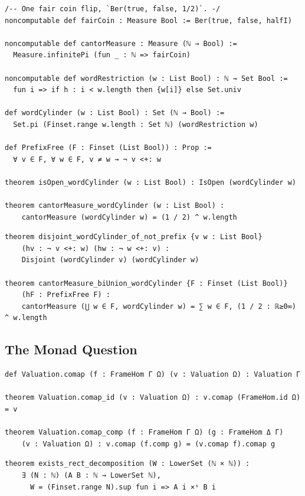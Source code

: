 \label{lean:isopen-wordcylinder}
\begin{lstlisting}
/-- One fair coin flip, `Ber(true, false, 1/2)`. -/
noncomputable def fairCoin : Measure Bool := Ber(true, false, halfI)

noncomputable def cantorMeasure : Measure (ℕ → Bool) :=
  Measure.infinitePi (fun _ : ℕ => fairCoin)

noncomputable def wordRestriction (w : List Bool) : ℕ → Set Bool :=
  fun i => if h : i < w.length then {w[i]} else Set.univ

def wordCylinder (w : List Bool) : Set (ℕ → Bool) :=
  Set.pi (Finset.range w.length : Set ℕ) (wordRestriction w)

def PrefixFree (F : Finset (List Bool)) : Prop :=
  ∀ v ∈ F, ∀ w ∈ F, v ≠ w → ¬ v <+: w

theorem isOpen_wordCylinder (w : List Bool) : IsOpen (wordCylinder w)

theorem cantorMeasure_wordCylinder (w : List Bool) :
    cantorMeasure (wordCylinder w) = (1 / 2) ^ w.length
\end{lstlisting}

\label{lean:cantormeasure-biunion-wordcylinder}
\begin{lstlisting}
theorem disjoint_wordCylinder_of_not_prefix {v w : List Bool}
    (hv : ¬ v <+: w) (hw : ¬ w <+: v) :
    Disjoint (wordCylinder v) (wordCylinder w)

theorem cantorMeasure_biUnion_wordCylinder {F : Finset (List Bool)}
    (hF : PrefixFree F) :
    cantorMeasure (⋃ w ∈ F, wordCylinder w) = ∑ w ∈ F, (1 / 2 : ℝ≥0∞) ^ w.length
\end{lstlisting}

\subsection{The Monad Question}

\label{lean:valuation-comap}
\begin{lstlisting}
def Valuation.comap (f : FrameHom Γ Ω) (v : Valuation Ω) : Valuation Γ

theorem Valuation.comap_id (v : Valuation Ω) : v.comap (FrameHom.id Ω) = v

theorem Valuation.comap_comp (f : FrameHom Γ Ω) (g : FrameHom Δ Γ)
    (v : Valuation Ω) : v.comap (f.comp g) = (v.comap f).comap g
\end{lstlisting}

\label{lean:exists-rect-decomposition}
\begin{lstlisting}
theorem exists_rect_decomposition (W : LowerSet (ℕ × ℕ)) :
    ∃ (N : ℕ) (A B : ℕ → LowerSet ℕ),
      W = (Finset.range N).sup fun i => A i ×ˢ B i
\end{lstlisting}

